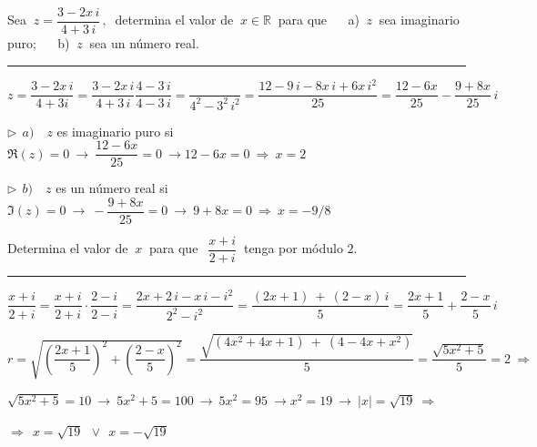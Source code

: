 \begin{miejercicio}

Sea $\ z=\dfrac{3-2x\, i}{4+3\, i}\, , \  $ determina el valor de $\ x\in \mathbb R\ $ para que
$\quad$ a) $\ z\ $ sea imaginario puro; $\quad$ b) $\ z\ $ sea un número real.

\rule{250pt}{0.5pt}

\vspace{4mm} $z=\dfrac{3-2x\, i}{4+3i}=\dfrac{3-2x\, i}{4+3\, i}\dfrac{4-3\, i}{4-3\, i}=\dfrac{}{4^2-3^2\, i^2}=\dfrac{12-9\, i-8x\, i+6x\, i^2}{25} = \dfrac{12-6x}{25}-\dfrac{9+8x}{25}\, i$

\vspace{4mm} $\triangleright\ \ a)\quad z$ es imaginario puro si $\Re(z)=0 \ \to \ \dfrac{12-6x}{25}=0 \ \to 12-6x=0 \ \Rightarrow \ x=2$

\vspace{2mm} $\triangleright\ \ b)\quad z$ es un número real si $\Im(z)=0 \ \to \ -\dfrac{9+8x}{25}=0 \ \to \ 9+8x=0 \ \Rightarrow \ x=-9/8$


\end{miejercicio}

\begin{miejercicio}

Determina el valor de $\ x \ $ para que $\ \ \dfrac{x+i}{2+i} \ $ tenga por módulo $2$.

\rule{250pt}{0.5pt}

\vspace{2mm} $\dfrac{x+i}{2+i} = \dfrac{x+i}{2+i} \cdot \dfrac{2-i}{2-i}=\dfrac{2x+2\, i -x\, i -i^2}{2^2-i^2} =\dfrac{(2x+1) \ + \ (2-x)\, i}{5}= \dfrac{2x+1}{5}+\dfrac{2-x}{5}\, i$

\vspace{2mm} $r=\sqrt{\left(\dfrac{2x+1}{5}\right)^2+\left(\dfrac{2-x}{5}\right)^2}= \dfrac{ \sqrt{ (4x^2+4x+1)\ + \ (4-4x+x^2) } }{5}=\dfrac{\sqrt{5x^2+5}}{5}=2 \ \Rightarrow$

\vspace{2mm} $ \sqrt{5x^2+5}=10 \ \to \ 5x^2+5=100 \ \to \ 5x^2=95 \ \to x^2=19 \ \to \ |x|=\sqrt{19} \ \Rightarrow \ $ 

\vspace{2mm} $\Rightarrow \ \  x=\sqrt{19} \ \ \vee \ \ x=-\sqrt{19}$

\end{miejercicio}

